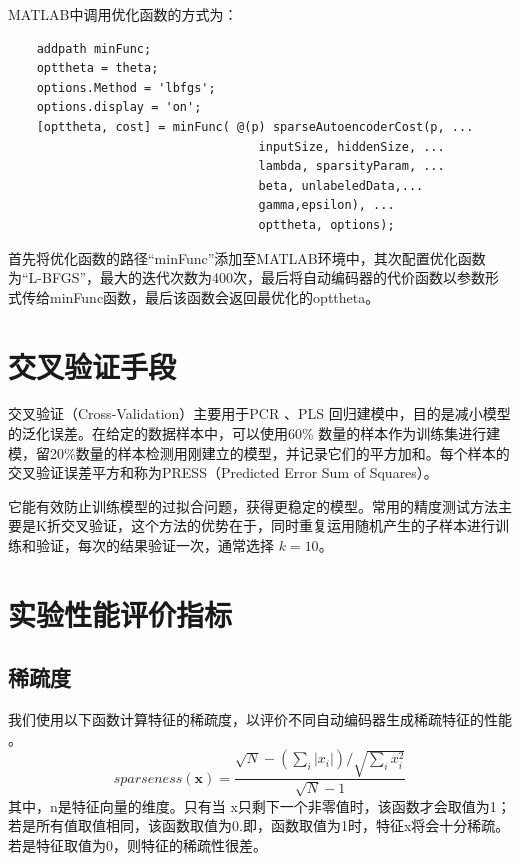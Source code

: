 \documentclass[oneside]{ZJUthesis}
\begin{document}
MATLAB中调用优化函数的方式为：
\begin{verbatim}
    addpath minFunc;
    opttheta = theta; 
    options.Method = 'lbfgs';
    options.display = 'on';
    [opttheta, cost] = minFunc( @(p) sparseAutoencoderCost(p, ...
                                   inputSize, hiddenSize, ...
                                   lambda, sparsityParam, ...
                                   beta, unlabeledData,...
                                   gamma,epsilon), ...
                                   opttheta, options);
\end{verbatim}
首先将优化函数的路径``minFunc''添加至MATLAB环境中，其次配置优化函数为``L-BFGS''，最大的迭代次数为400次，最后将自动编码器的代价函数以参数形式传给minFunc函数，最后该函数会返回最优化的opttheta。

\section{交叉验证手段}
交叉验证（Cross-Validation）主要用于PCR 、PLS 回归建模中，目的是减小模型的泛化误差。在给定的数据样本中，可以使用60\% 数量的样本作为训练集进行建模，留20\%数量的样本检测用刚建立的模型，并记录它们的平方加和。每个样本的交叉验证误差平方和称为PRESS（Predicted Error Sum of Squares）。

它能有效防止训练模型的过拟合问题，获得更稳定的模型。常用的精度测试方法主要是K折交叉验证，这个方法的优势在于，同时重复运用随机产生的子样本进行训练和验证，每次的结果验证一次，通常选择 $k=10$。



\section{实验性能评价指标}
\subsection{稀疏度}
我们使用以下函数计算特征的稀疏度，以评价不同自动编码器生成稀疏特征的性能 \cite{DBLP:journals/jmlr/Hoyer04}。
\begin{equation}
sparseness(\textbf{x}) = \frac{\sqrt{N} - (\sum_i{|x_i|}) / \sqrt{\sum_i{x_i^2}}}{\sqrt{N} - 1}
\end{equation}
其中，n是特征向量的维度。只有当 x只剩下一个非零值时，该函数才会取值为1；若是所有值取值相同，该函数取值为0.即，函数取值为1时，特征x将会十分稀疏。若是特征取值为0，则特征的稀疏性很差。
\end{document}
